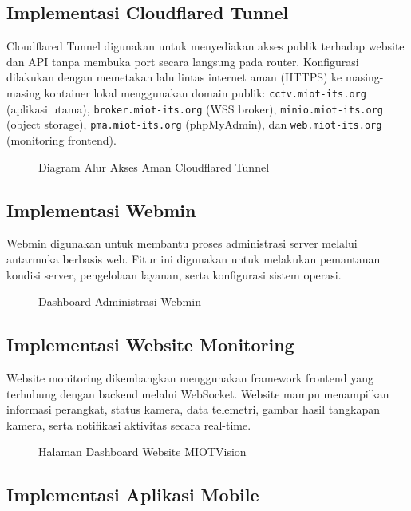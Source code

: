 \subsection{Implementasi Cloudflared Tunnel}

Cloudflared Tunnel digunakan untuk menyediakan akses publik terhadap website dan API tanpa membuka port secara langsung pada router. Konfigurasi dilakukan dengan memetakan lalu lintas internet aman (HTTPS) ke masing-masing kontainer lokal menggunakan domain publik: \texttt{cctv.miot-its.org} (aplikasi utama), \texttt{broker.miot-its.org} (WSS broker), \texttt{minio.miot-its.org} (object storage), \texttt{pma.miot-its.org} (phpMyAdmin), dan \texttt{web.miot-its.org} (monitoring frontend).

\begin{figure}[H]
\caption{Diagram Alur Akses Aman Cloudflared Tunnel}
\label{fig:cloudflared_tunnel}
\end{figure}

\subsection{Implementasi Webmin}

Webmin digunakan untuk membantu proses administrasi server melalui antarmuka berbasis web. Fitur ini digunakan untuk melakukan pemantauan kondisi server, pengelolaan layanan, serta konfigurasi sistem operasi.

\begin{figure}[H]
\caption{Dashboard Administrasi Webmin}
\label{fig:webmin_dashboard}
\end{figure}

\subsection{Implementasi Website Monitoring}

Website monitoring dikembangkan menggunakan framework frontend yang terhubung dengan backend melalui WebSocket. Website mampu menampilkan informasi perangkat, status kamera, data telemetri, gambar hasil tangkapan kamera, serta notifikasi aktivitas secara real-time.

\begin{figure}[H]
\caption{Halaman Dashboard Website MIOTVision}
\label{fig:website_monitoring}
\end{figure}

\subsection{Implementasi Aplikasi Mobile}

